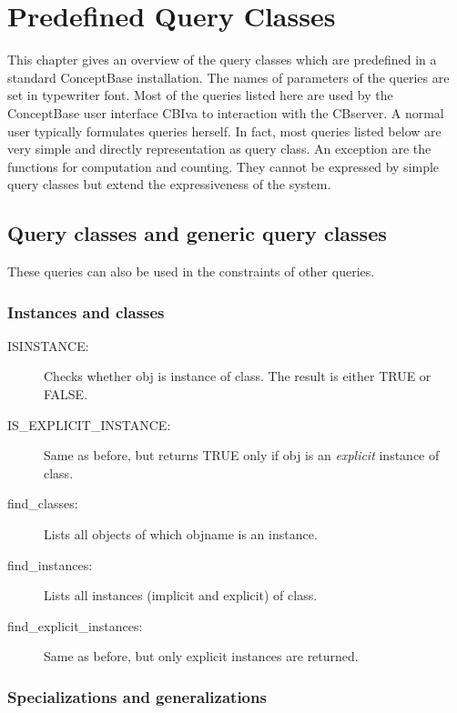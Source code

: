 \chapter{Predefined Query Classes}
\label{cap:builtin-queries}

This chapter gives an overview of the query classes which
are predefined in a standard ConceptBase installation.
The names of parameters of the queries are set in {\ttfamily typewriter} font.
Most of the queries listed here are used by the ConceptBase user 
interface CBIva to interaction with the CBserver. A normal user 
typically formulates queries herself. In fact, most queries listed below are 
very simple and directly representation as query class.
An exception are the functions for computation and counting. They
cannot be expressed by simple query classes but extend the expressiveness
of the system.


\section{Query classes and generic query classes}

These queries can also be used in the constraints of other queries.

\subsection{Instances and classes}

\begin{description}
\item[ISINSTANCE:] Checks whether {\ttfamily obj} is instance of {\ttfamily class}.
The result is either {\ttfamily TRUE} or {\ttfamily FALSE}.
\item[IS\_EXPLICIT\_INSTANCE:] Same as before, but returns {\ttfamily TRUE} only if
{\ttfamily obj} is an {\em explicit} instance of {\ttfamily class}.
\item[find\_classes:] Lists all objects of which {\ttfamily objname} is an instance.
\item[find\_instances:] Lists all instances (implicit and explicit) of {\ttfamily class}.
\item[find\_explicit\_instances:] Same as before, but only explicit instances are returned.
\end{description}

\subsection{Specializations and generalizations}

